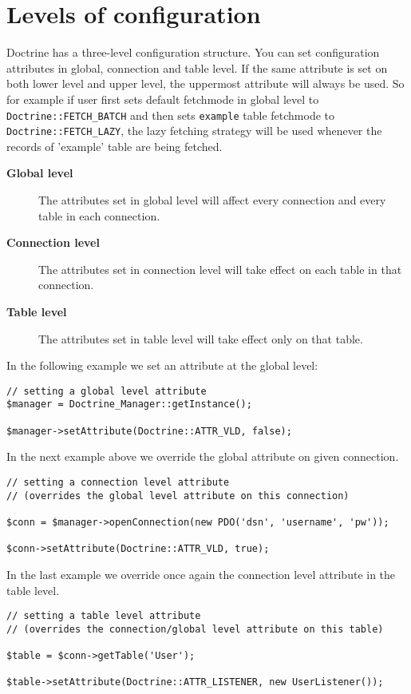 \documentclass[11pt,a4paper]{report}
\begin{document}
\section{Levels of configuration}
Doctrine has a three-level configuration structure. You can set configuration attributes in global, connection and table level. If the same attribute is set on both lower level and upper level, the uppermost attribute will always be used. So for example if user first sets default fetchmode in global level to \texttt{Doctrine::FETCH\_BATCH} and then sets \texttt{example} table fetchmode to \texttt{Doctrine::FETCH\_LAZY}, the lazy fetching strategy will be used whenever the records of 'example' table are being fetched.

\begin{description}
\item[\textbf{Global level}] {The attributes set in global level will affect every connection and every table in each connection.}
\item[\textbf{Connection level}] {The attributes set in connection level will take effect on each table in that connection.}
\item[\textbf{Table level}] {The attributes set in table level will take effect only on that table.}
\end{description}

In the following example we set an attribute at the global level:

\begin{verbatim}
// setting a global level attribute
$manager = Doctrine_Manager::getInstance();

$manager->setAttribute(Doctrine::ATTR_VLD, false);
\end{verbatim}

In the next example above we override the global attribute on given connection.

\begin{verbatim}
// setting a connection level attribute
// (overrides the global level attribute on this connection)

$conn = $manager->openConnection(new PDO('dsn', 'username', 'pw'));

$conn->setAttribute(Doctrine::ATTR_VLD, true);
\end{verbatim}

In the last example we override once again the connection level attribute in the table level.

\begin{verbatim}
// setting a table level attribute
// (overrides the connection/global level attribute on this table)

$table = $conn->getTable('User');

$table->setAttribute(Doctrine::ATTR_LISTENER, new UserListener());
\end{verbatim}
\end{document}

